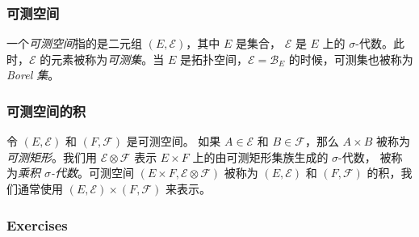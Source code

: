 \documentclass[fontset=none]{Notes}
\begin{document}
\subsubsection{可测空间}

一个\emph{可测空间}指的是二元组 $(E,\mathcal{E})$，其中 $E$ 是集合，
$\mathcal{E}$ 是 $E$ 上的 $\sigma$-代数。此时，$\mathcal{E}$
的元素被称为\emph{可测集}。当 $E$ 是拓扑空间，$\mathcal{E}=\mathcal{B}_E$
的时候，可测集也被称为\emph{Borel 集}。

\subsubsection{可测空间的积}

令 $(E,\mathcal{E})$ 和 $(F,\mathcal{F})$ 是可测空间。
如果 $A\in \mathcal{E}$ 和 $B\in \mathcal{F}$，那么 $A\times B$
被称为\emph{可测矩形}。我们用 $\mathcal{E}\otimes \mathcal{F}$
表示 $E\times F$ 上的由可测矩形集族生成的 $\sigma$-代数，
被称为\emph{乘积 $\sigma$-代数}。可测空间 $(E\times F,\mathcal{E}\otimes \mathcal{F})$
被称为 $(E,\mathcal{E})$ 和 $(F,\mathcal{F})$ 的积，我们通常使用
$(E,\mathcal{E})\times (F,\mathcal{F})$ 来表示。

\subsubsection{Exercises}
\end{document}
